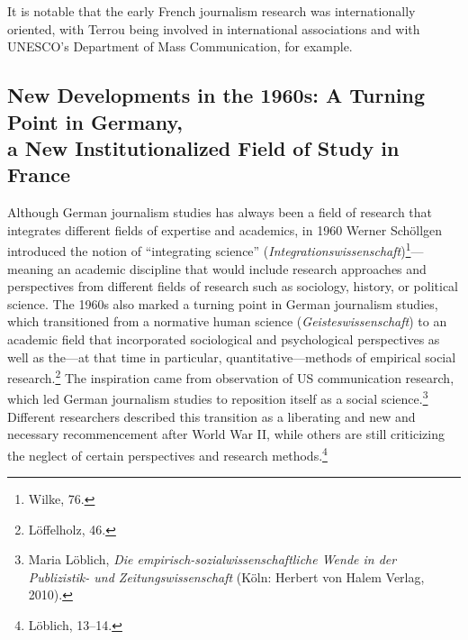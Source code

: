 \documentclass{tufte-handout}
\begin{document}
It is notable that the early French journalism research was
internationally oriented, with Terrou being involved in international
associations and with UNESCO's Department of Mass Communication, for
example.

\newpage\hypertarget{new-developments-in-the-1960s-a-turning-point-in-germany-a-new-institutionalized-field-of-study-in-france}{%
\subsection{New Developments in the 1960s: A
Turning Point in Germany,\\\noindent a New Institutionalized Field of Study in
France}\label{new-developments-in-the-1960s-a-turning-point-in-germany-a-new-institutionalized-field-of-study-in-france}}

Although German journalism studies has always been a field of research
that integrates different fields of expertise and academics, in 1960
Werner Schöllgen introduced the notion of ``integrating science''
(\emph{Integrationswissenschaft})\footnote{Wilke, 76.}---meaning an
academic discipline that would include research approaches and
perspectives from different fields of research such as sociology,
history, or political science. The 1960s also marked a turning point in
German journalism studies, which transitioned from a normative human
science (\emph{Geisteswissenschaft}) to an academic field that
incorporated sociological and psychological perspectives as well as
the---at that time in particular, quantitative---methods of empirical
social research.\footnote{Löffelholz, 46.} The inspiration came from
observation of US communication research, which led German journalism
studies to reposition itself as a social science.\footnote{Maria
  Löblich, \emph{Die empirisch-sozialwissenschaftliche Wende in der
  Publizistik- und Zeitungswissenschaft} (Köln: Herbert von Halem
  Verlag, 2010).} Different researchers described this transition as a
liberating and new and necessary recommencement after World War II,
while others are still criticizing the neglect of certain perspectives
and research methods.\footnote{Löblich, 13--14.}
\end{document}
